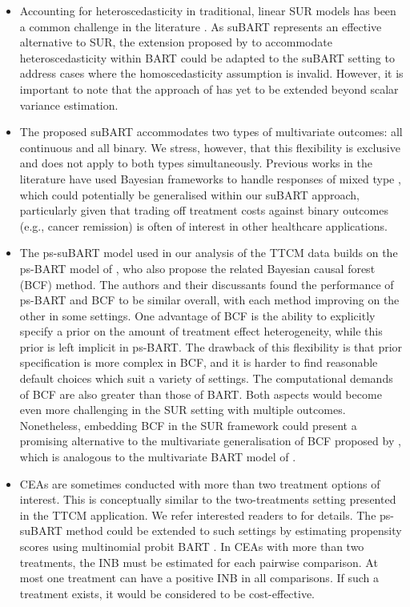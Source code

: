 \documentclass[aoas,preprint]{imsart}
\theoremstyle{plain}
\theoremstyle{definition}
\theoremstyle{remark}
\begin{document}
\begin{itemize}[wide]
    \item Accounting for heteroscedasticity in traditional, linear SUR models has been a common challenge in the literature \citep{afolayan2018efficiency}. As suBART represents an effective alternative to SUR, the extension proposed by \citet{pratola2020heteroscedastic} to accommodate heteroscedasticity within BART could be adapted to the suBART setting to address cases where the homoscedasticity assumption is invalid. However, it is important to note that the approach of \citet{pratola2020heteroscedastic} has yet to be extended beyond scalar variance estimation.
    \item The proposed suBART accommodates two types of multivariate outcomes: all continuous and all binary. We stress, however, that this flexibility is exclusive and does not apply to both types simultaneously. Previous works in the literature have used Bayesian frameworks to handle responses of mixed type \citep[e.g.][]{flexible2014papa, zhang2015bayesprobit, bayesianmix20216tony}, which could potentially be generalised within our suBART approach, particularly given that trading off treatment costs against binary outcomes (e.g., cancer remission) is often of interest in other healthcare applications.
    \item The ps-suBART model used in our analysis of the TTCM data builds on the ps-BART model of \citet{hahn2020bayesian}, who also propose the related Bayesian causal forest (BCF) method. The authors and their discussants found the performance of ps-BART and BCF to be similar overall, with each method improving on the other in some settings. One advantage of BCF is the ability to explicitly specify a prior on the amount of treatment effect heterogeneity, while this prior is left implicit in ps-BART. The drawback of this flexibility is that prior specification is more complex in BCF, and it is harder to find reasonable default choices which suit a variety of settings. The computational demands of BCF are also greater than those of BART. Both aspects would become even more challenging in the SUR setting with multiple outcomes. Nonetheless, embedding BCF in the SUR framework could present a promising alternative to the multivariate generalisation of BCF proposed by \citet{mcjames2024bayesian}, which is analogous to the multivariate BART model of \citet{um2023bayesian}.
    \item CEAs are sometimes conducted with more than two treatment options of interest. This is conceptually similar to the two-treatments setting presented in the TTCM application. We refer interested readers to \citet[Section~4.4]{drummond2015methods} for details. The ps-suBART method could be extended to such settings by estimating propensity scores using multinomial probit BART \citep{kindo2016multinomial}. In CEAs with more than two treatments, the INB must be estimated for each pairwise comparison. At most one treatment can have a positive INB in all comparisons. If such a treatment exists, it would be considered to be cost-effective.
    

\end{itemize}
\end{document}
